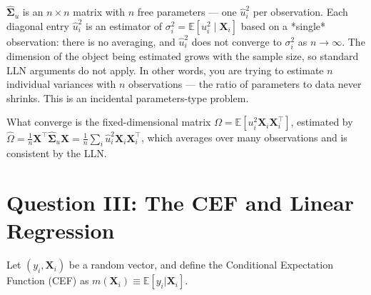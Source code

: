 \documentclass[letterpaper,12pt]{article}
\begin{document}
\begin{enumerate}[label=(\alph*)]
$\hat{\boldsymbol{\Sigma}}_u$ is an $n \times n$ matrix with $n$ free parameters — one $\hat{u}_i^2$ per observation. Each diagonal entry $\hat{u}_i^2$ is an estimator of $\sigma_i^2 = \mathbb{E}[u_i^2 \mid \mathbf{X}_i]$ based on a *single* observation: there is no averaging, and $\hat{u}_i^2$ does not converge to $\sigma_i^2$ as $n \to \infty$. The dimension of the object being estimated grows with the sample size, so standard LLN arguments do not apply. In other words, you are trying to estimate $n$ individual variances with $n$ observations — the ratio of parameters to data never shrinks. This is an incidental parameters-type problem.

What converge is the fixed-dimensional matrix $\Omega = \mathbb{E}[u_i^2 \mathbf{X}_i \mathbf{X}_i^\top]$, estimated by $\hat{\Omega} = \frac{1}{n}\mathbf{X}^\top \hat{\boldsymbol{\Sigma}}_u \mathbf{X} = \frac{1}{n}\sum_i \hat{u}_i^2 \mathbf{X}_i\mathbf{X}_i^\top$, which averages over many observations and is consistent by the LLN.


\end{enumerate}

\section*{Question III: The CEF and Linear Regression}

Let $(y_i, \mathbf{X}_i)$ be a random vector, and define the Conditional Expectation Function (CEF) as $m(\mathbf{X}_i)\equiv\mathbb{E}[y_i|\mathbf{X}_i]$.
\end{document}
